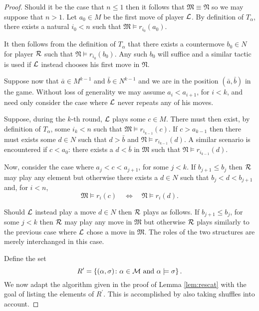 \begin{proof}
	Should it be the case that $n\leq 1$ then it follows that
	$\mathfrak{M}\equiv\mathfrak{N}$ so we may suppose that $n>1$.  Let $a_0\in M$
	be the first move of player $\mathcal{L}$.  By definition of $T_\alpha$, there exists
	a natural $i_0<n$ such that $\mathfrak{M}\models r_{i_0}(a_0)$.

	It then follows from the definition of $T_\alpha$ that there exists a
	countermove $b_0\in N$ for player $\mathcal{R}$ such that
	$\mathfrak{N}\models r_{i_0}(b_0)$.  Any such $b_0$ will suffice and a similar
	tactic is used if $\mathcal{L}$ instead chooses his first move in $\mathfrak{N}$.

	Suppose now that $\bar{a}\in M^{k-1}$ and $\bar{b}\in N^{k-1}$ and we are in
	the position $(\bar{a},\bar{b})$ in the game.  Without loss of generality we may
	assume $a_i<a_{i+1}$, for $i<k$, and need only consider the case where $\mathcal{L}$
	never repeats any of his moves.

	Suppose, during the $k$-th round, $\mathcal{L}$ plays some $c\in M$.  There must
	then exist, by definition of $T_\alpha$, some $i_k<n$ such that
	$\mathfrak{M}\models r_{i_{k-1}}(c)$.  If $c>a_{k-1}$ then there must exists
	some $d\in N$ such that $d>\bar{b}$ and $\mathfrak{N}\models r_{i_{k-1}}(d)$.  A
	similar scenario is encountered if $c<a_0$: there exists a $d<\bar{b}$ in
	$\mathfrak{M}$ such that $\mathfrak{N}\models r_{i_{k-1}}(d)$.

	Now, consider the case where $a_j<c<a_{j+1}$, for some $j<k$.  If
	$b_{j+1}\leq b_j$ then $\mathcal{R}$ may play any element but otherwise there exists
	a $d\in N$ such that $b_j<d<b_{j+1}$ and, for $i<n$,
	\begin{equation} \mathfrak{M}\models r_i(c)\quad\iff\quad\mathfrak{N}\models r_i(d).
	\end{equation}

	Should $\mathcal{L}$ instead play a move $d\in N$ then $\mathcal{R}$ plays as follows.
	If $b_{j+1}\leq b_j$, for some $j<k$ then $\mathcal{R}$ may play any move in
	$\mathfrak{M}$ but otherwise $\mathcal{R}$ plays similarly to the previous case where
	$\mathcal{L}$ chose a move in $\mathfrak{M}$.  The roles of the two structures are
	merely interchanged in this case.

	Define the set
	\begin{equation} R^\prime=\left\lbrace (\alpha,\sigma)\colon \alpha\in\mathcal{M}\text{ and
			}\alpha\models\sigma \right\rbrace.
	\end{equation} We now adapt the algorithm given in the proof of Lemma
	\ref{lem:rescat} with the goal of listing the elements of $R^\prime$.  This is
	accomplished by also taking shuffles into account.


\end{proof}
